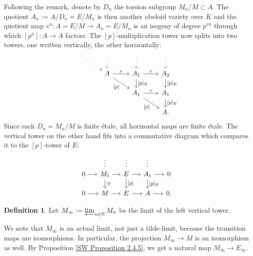 \documentclass[10pt,oneside]{amsart}
\theoremstyle{definition}
\newtheorem{definition}[theorem]{Definition}
\newcommand{\N}{\mathbb{N}}
\begin{document}
	Following the remark, denote by $D_n$ the torsion subgroup $M_n/M\subset A$. The quotient $A_n:=A/D_n = E/M_n$ is then another abeloid variety over $K$ and the quotient map $v^n\colon A=E/M\rightarrow A_n=E/M_n$ is an isogeny of degree $p^{rn}$  through which  $[p^n]\colon A\rightarrow A$ factors. The $[p]$-multiplication tower now splits into two towers, one written vertically, the other horizontally:
		\begin{equation}\label{p-multiplication tower of E/M splits into vertical and horizontal tower}
		\begin{tikzcd}[row sep={1cm,between origins},column sep={1.5cm,between origins}]
		{} \arrow[rd, dotted] & {} \arrow[d, dotted]           & {} \arrow[d, dotted]           & {} \arrow[d, dotted]    \\
		& A \arrow[r,"v"] \arrow[rd,"{[p]}"'] & {A_1} \arrow[d,"{[p]_E}"] \arrow[r,"v"]  & {A_2} \arrow[d,"{[p]_E}"]     \\
		&                                & A_1\arrow[r,"v"] \arrow[rd,"{[p]}"'] & {A_1} \arrow[d, ,"{[p]_E}"] \\
		&                                &                                & {A.}              
		\end{tikzcd}
		\end{equation}
		Since each $D_n=M_n/M$ is finite \'etale, all horizontal maps are finite \'etale. The vertical tower on the other hand fits into a commutative diagram which compares it to the $[p]$-tower of $E$:
		\begin{equation}\label{F-tower for E/M}
		\begin{tikzcd}[column sep={1.1cm,between origins},row sep={0.5cm,between origins}]
			&\vdots&\vdots&\vdots&\\
			0 \arrow[r] & M_1 \arrow[dd, "\cong"] \arrow[r] & E \arrow[dd, "{[p]}"] \arrow[r] & A_1 \arrow[dd, "{[p]_E}"] \arrow[r] & 0 \\
			\\
			0 \arrow[r] & M \arrow[r] & E \arrow[r] & A \arrow[r] & 0.
		\end{tikzcd}
		\end{equation}
		\begin{definition}
			Let $M_\infty:=\varprojlim_{n\in\N} M_n$ be the limit of the left vertical tower. 
		\end{definition}
		We note that $M_\infty$ is an actual limit, not just a tilde-limit, because the transition maps are isomorphisms. In particular, the projection $M_\infty\to M$ is an isomorphism as well. 
		By Proposition \ref{SW Proposition 2.4.5}, we get a natural map $M_\infty\to E_\infty$. 
\end{document}
